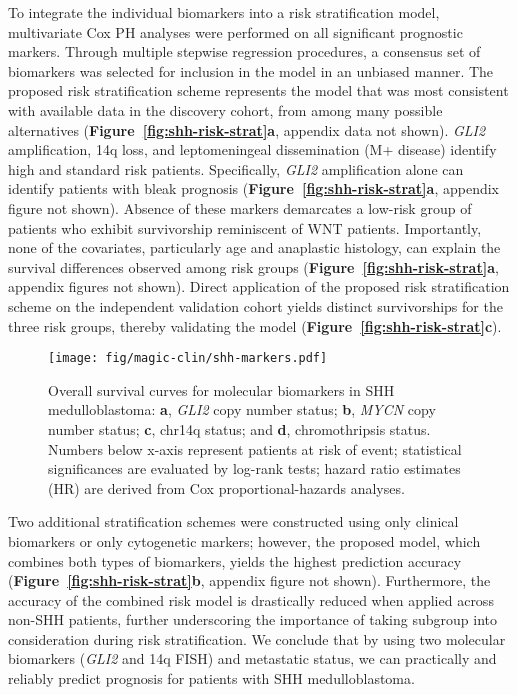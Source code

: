 \documentclass[11pt,letterpaper]{article}
\theoremstyle{definition}
\newcommand{\emphlab}[1]{\textbf{\textsf{#1}}}
\newcommand{\citefig}[1]{\emphlab{Figure~\ref{fig:#1}}}
\begin{document}
To integrate the individual biomarkers into a risk stratification model, multivariate Cox PH analyses were performed on all significant prognostic markers. Through multiple stepwise regression procedures, a consensus set of biomarkers was selected for inclusion in the model in an unbiased manner. The proposed risk stratification scheme represents the model that was most consistent with available data in the discovery cohort, from among many possible alternatives (\citefig{shh-risk-strat}\emphlab{a}, appendix data not shown). \emph{GLI2} amplification, 14q loss, and leptomeningeal dissemination (M+ disease) identify high and standard risk patients. Specifically, \emph{GLI2} amplification alone can identify patients with bleak prognosis (\citefig{shh-risk-strat}\emphlab{a}, appendix figure not shown). Absence of these markers demarcates a low-risk group of patients who exhibit survivorship reminiscent of WNT patients. Importantly, none of the covariates, particularly age and anaplastic histology, can explain the survival differences observed among risk groups (\citefig{shh-risk-strat}\emphlab{a}, appendix figures not shown). Direct application of the proposed risk stratification scheme on the independent validation cohort yields distinct survivorships for the three risk groups, thereby validating the model (\citefig{shh-risk-strat}\emphlab{c}).

\begin{figure}[h]
	\begin{center}
		\texttt{[image: fig/magic-clin/shh-markers.pdf]}
	\end{center}
	\caption[Overall survival curves for molecular biomarkers in SHH medulloblastoma]
	{
	Overall survival curves for molecular biomarkers in SHH medulloblastoma:
	\textbf{a}, \emph{GLI2} copy number status;
	\textbf{b}, \emph{MYCN} copy number status;
	\textbf{c}, chr14q status; and
	\textbf{d}, chromothripsis status.
	Numbers below x-axis represent patients at risk of event; statistical significances are evaluated by log-rank tests; hazard ratio estimates (HR) are derived from Cox proportional-hazards analyses.
	}
	\label{fig:shh-markers}
\end{figure}

Two additional stratification schemes were constructed using only clinical biomarkers or only cytogenetic markers; however, the proposed model, which combines both types of biomarkers, yields the highest prediction accuracy (\citefig{shh-risk-strat}\emphlab{b}, appendix figure not shown). Furthermore, the accuracy of the combined risk model is drastically reduced when applied across non-SHH patients, further underscoring the importance of taking subgroup into consideration during risk stratification. We conclude that by using two molecular biomarkers (\emph{GLI2} and 14q FISH) and metastatic status, we can practically and reliably predict prognosis for patients with SHH medulloblastoma.
\end{document}
